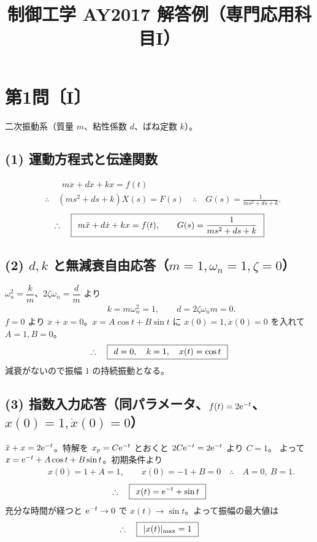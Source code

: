 \documentclass[11pt,a4paper]{article}
\title{制御工学 AY2017 解答例（専門応用科目I）}
\author{}
\date{}
\begin{document}
\maketitle

\section*{第1問〔I〕}

二次振動系（質量 $m$、粘性係数 $d$、ばね定数 $k$）。

\subsection*{(1) 運動方程式と伝達関数}
\begin{align*}
  &\qquad m\ddot{x}+d\dot{x}+kx=f(t)\\
  &\therefore\quad (ms^2+ds+k)X(s)=F(s)
   \quad\therefore\quad G(s)=\frac{1}{ms^2+ds+k}.
\end{align*}
\[
  \therefore\quad \boxed{\,\;m\ddot{x}+d\dot{x}+kx=f(t),\qquad G(s)=\dfrac{1}{ms^2+ds+k}\;\,}
\]

\subsection*{(2) $d,k$ と無減衰自由応答（$m=1,\omega_n=1,\zeta=0$）}
$\omega_n^2=\dfrac{k}{m}$、$2\zeta\omega_n=\dfrac{d}{m}$ より
\begin{align*}
  &\qquad k=m\omega_n^2=1,\qquad d=2\zeta\omega_n m=0.
\end{align*}
$f=0$ より $\ddot{x}+x=0$。$x=A\cos t+B\sin t$ に $x(0)=1,\dot x(0)=0$ を入れて $A=1,B=0$。
\[
  \therefore\quad \boxed{\,\;d=0,\quad k=1,\quad x(t)=\cos t\;\,}
\]
減衰がないので振幅 $1$ の持続振動となる。

\begin{center}
\end{center}

\subsection*{(3) 指数入力応答（同パラメータ、$f(t)=2\mathrm{e}^{-t}$、$x(0)=1,\dot x(0)=0$）}
$\ddot{x}+x=2\mathrm{e}^{-t}$。特解を $x_p=C\mathrm{e}^{-t}$ とおくと $2C\mathrm{e}^{-t}=2\mathrm{e}^{-t}$ より $C=1$。
よって $x=\mathrm{e}^{-t}+A\cos t+B\sin t$。初期条件より
\begin{align*}
  &\qquad x(0)=1+A=1,\qquad \dot{x}(0)=-1+B=0
   \quad\therefore\quad A=0,\ B=1.
\end{align*}
\[
  \therefore\quad \boxed{\,\;x(t)=\mathrm{e}^{-t}+\sin t\;\,}
\]
充分な時間が経つと $\mathrm{e}^{-t}\to0$ で $x(t)\to\sin t$。よって振幅の最大値は
\[
  \therefore\quad \boxed{\,\;|x(t)|_{\max}=1\;\,}
\]
\end{document}
